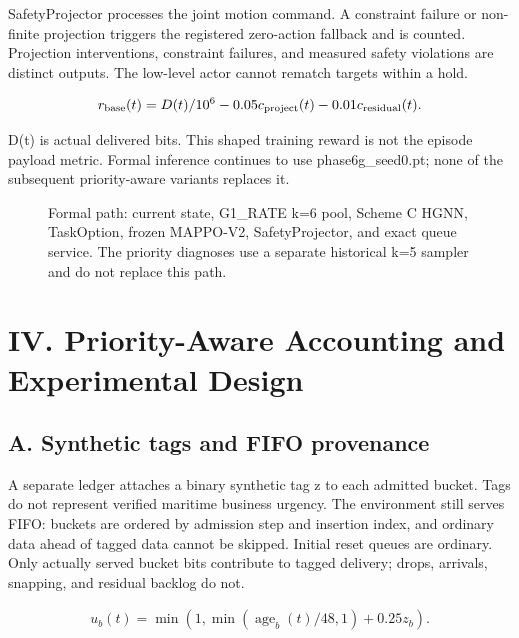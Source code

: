 SafetyProjector processes the joint motion command. A constraint failure or non-finite projection triggers the registered zero-action fallback and is counted. Projection interventions, constraint failures, and measured safety violations are distinct outputs. The low-level actor cannot rematch targets within a hold.

\begin{equation*}
\begin{gathered}
r_{\rm base}(t)=D(t)/10^6-0.05c_{\rm project}(t)-0.01c_{\rm residual}(t).
\end{gathered}
\end{equation*}

D(t) is actual delivered bits. This shaped training reward is not the episode payload metric. Formal inference continues to use phase6g\_seed0.pt; none of the subsequent priority-aware variants replaces it.

\begin{figure}[tbp]
\centering

\caption{Formal path: current state, G1\_RATE k=6 pool, Scheme C HGNN, TaskOption, frozen MAPPO-V2, SafetyProjector, and exact queue service. The priority diagnoses use a separate historical k=5 sampler and do not replace this path.}
\label{fig:formal-architecture}
\end{figure}

\section*{IV. Priority-Aware Accounting and Experimental Design}

\subsection*{A. Synthetic tags and FIFO provenance}

A separate ledger attaches a binary synthetic tag z to each admitted bucket. Tags do not represent verified maritime business urgency. The environment still serves FIFO: buckets are ordered by admission step and insertion index, and ordinary data ahead of tagged data cannot be skipped. Initial reset queues are ordinary. Only actually served bucket bits contribute to tagged delivery; drops, arrivals, snapping, and residual backlog do not.

\begin{equation*}
\begin{gathered}
u_b(t)=\min\!\left(1,\min(\operatorname{age}_b(t)/48,1)+0.25z_b\right).
\end{gathered}
\end{equation*}


